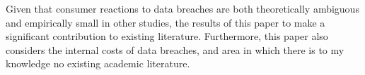 \documentclass[../Main.tex]{subfiles}
\begin{document}
Given that consumer reactions to data breaches are both theoretically ambiguous and empirically small in other studies, the results of this paper to make a significant contribution to existing literature. Furthermore, this paper also considers the internal costs of data breaches, and area in which there is to my knowledge no existing academic literature.

\biblio %
\end{document}
